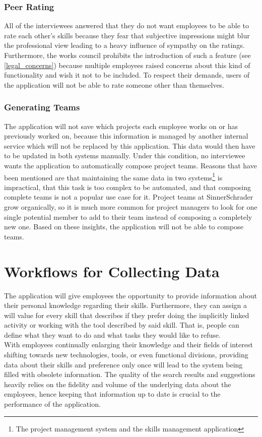 \subsubsection{Peer Rating}
\label{peerrating}
All of the interviewees answered that they do not want employees to be able to rate each other's skills because they fear that subjective impressions might blur the professional view leading to a heavy influence of sympathy on the ratings. Furthermore, the works council prohibits the introduction of such a feature (see \ref{legal_concerns}) because multiple employees raised concerns about this kind of functionality and wish it not to be included. To respect their demands, users of the application will not be able to rate someone other than themselves.

\subsubsection{Generating Teams}
The application will not save which projects each employee works on or has previously worked on, because this information is managed by another internal service which will not be replaced by this application. This data would then have to be updated in both systems manually. Under this condition, no interviewee wants the application to automatically compose project teams. Reasons that have been mentioned are that maintaining the same data in two systems\footnote{The project management system and the skills management application} is impractical, that this task is too complex to be automated, and that composing complete teams is not a popular use case for it. Project teams at SinnerSchrader grow organically, so it is much more common for project managers to look for one single potential member to add to their team instead of composing a completely new one. Based on these insights, the application will not be able to compose teams.

\section{Workflows for Collecting Data}

The application will give employees the opportunity to provide information about their personal knowledge regarding their skills.
Furthermore, they can assign a will value for every skill that describes if they prefer
doing the implicitly linked activity or working with the tool described by said skill. That is, people can define what they want to do and what tasks they would like to refuse.\\
With employees continually enlarging their knowledge and their fields of interest shifting towards new technologies, tools, or even
functional divisions, providing data about their skills and preference only once will lead to the system being filled with obsolete
information. The quality of the search results and suggestions heavily relies on the fidelity and volume of the underlying data about the employees, hence keeping that information up to date is crucial to the performance of the application.

